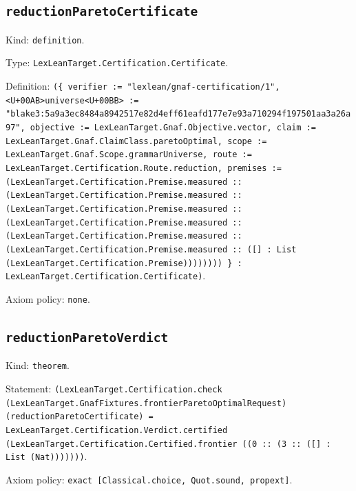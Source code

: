 \documentclass[11pt]{article}
\begin{document}
\subsection*{\texttt{reductionParetoCertificate}}
\noindent Kind: \texttt{definition}.\par
\noindent Type: \texttt{LexLeanTarget.Certification.Certificate}.\par
\noindent Definition: \texttt{(\{ verifier := "lexlean/gnaf-certification/1", <U+00AB>universe<U+00BB> := "blake3:5a9a3ec8484a8942517e82d4eff61eafd177e7e93a710294f197501aa3a26a97", objective := LexLeanTarget.Gnaf.Objective.vector, claim := LexLeanTarget.Gnaf.ClaimClass.paretoOptimal, scope := LexLeanTarget.Gnaf.Scope.grammarUniverse, route := LexLeanTarget.Certification.Route.reduction, premises := (LexLeanTarget.Certification.Premise.measured :: (LexLeanTarget.Certification.Premise.measured :: (LexLeanTarget.Certification.Premise.measured :: (LexLeanTarget.Certification.Premise.measured :: (LexLeanTarget.Certification.Premise.measured :: (LexLeanTarget.Certification.Premise.measured :: ([] : List (LexLeanTarget.Certification.Premise)))))))) \} : LexLeanTarget.Certification.Certificate)}.\par
\noindent Axiom policy: \texttt{none}.\par
\subsection*{\texttt{reductionParetoVerdict}}
\noindent Kind: \texttt{theorem}.\par
\noindent Statement: \texttt{(LexLeanTarget.Certification.check (LexLeanTarget.GnafFixtures.frontierParetoOptimalRequest) (reductionParetoCertificate) = LexLeanTarget.Certification.Verdict.certified (LexLeanTarget.Certification.Certified.frontier ((0 :: (3 :: ([] : List (Nat)))))))}.\par
\noindent Axiom policy: \texttt{exact [Classical.choice, Quot.sound, propext]}.\par
\end{document}
